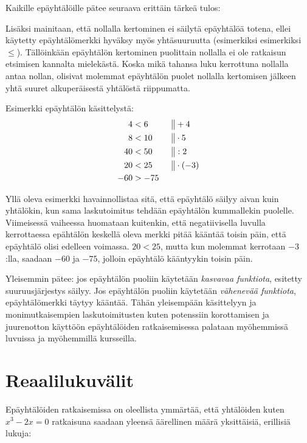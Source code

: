 Kaikille epäyhtälöille pätee seuraava erittäin tärkeä tulos:


Lisäksi mainitaan, että nollalla kertominen ei säilytä epäyhtälöä totena, ellei käytetty epäyhtälömerkki hyväksy myös yhtäsuuruutta (esimerkiksi esimerkiksi $\leq$). Tällöinkään epäyhtälön kertominen puolittain nollalla ei ole ratkaisun etsimisen kannalta mielekästä. Koska mikä tahansa luku kerrottuna nollalla antaa nollan, olisivat molemmat epäyhtälön puolet nollalla kertomisen jälkeen yhtä suuret alkuperäisestä yhtälöstä riippumatta.

\begin{esimerkki}

Esimerkki epäyhtälön käsittelystä:
\begin{align*}
4&<6  \ \ \ \ \ &&\big\| +4 \\
8&<10 &&\big\| \cdot 5 \\
40&<50 &&\big\| :2 \\
20&<25 &&\big\| \cdot (-3) \\
-60&>-75
\end{align*}
\end{esimerkki}

Yllä oleva esimerkki havainnollistaa sitä, että epäyhtälö säilyy aivan kuin
yhtälökin, kun sama laskutoimitus tehdään epäyhtälön kummallekin puolelle.
Viimeisessä vaiheessa huomataan kuitenkin, että negatiivisella luvulla
kerrottaessa epähtälön keskellä oleva merkki pitää kääntää toisin päin, että
epäyhtälö olisi edelleen voimassa. $20<25$, mutta kun molemmat kerrotaan
$-3$:lla, saadaan $-60$ ja $-75$, jolloin epäyhtälö kääntyykin toisin päin.

Yleisemmin pätee: jos epäyhtälön puoliin käytetään \emph{kasvavaa funktiota}, esitetty suuruusjärjestys säilyy. Jos epäyhtälön puoliin käytetään \emph{vähenevää funktiota}, epäyhtälömerkki täytyy kääntää. Tähän yleisempään käsittelyyn ja monimutkaisempien laskutoimitusten kuten potenssiin korottamisen ja juurenotton käyttöön epäyhtälöiden ratkaisemisessa palataan myöhemmissä luvuissa ja myöhemmillä kursseilla.

\section{Reaalilukuvälit}

Epäyhtälöiden ratkaisemissa on oleellista ymmärtää, että yhtälöiden kuten $x^3-2x=0$ ratkaisuna saadaan yleensä äärellinen määrä yksittäisiä, erillisiä lukuja:

